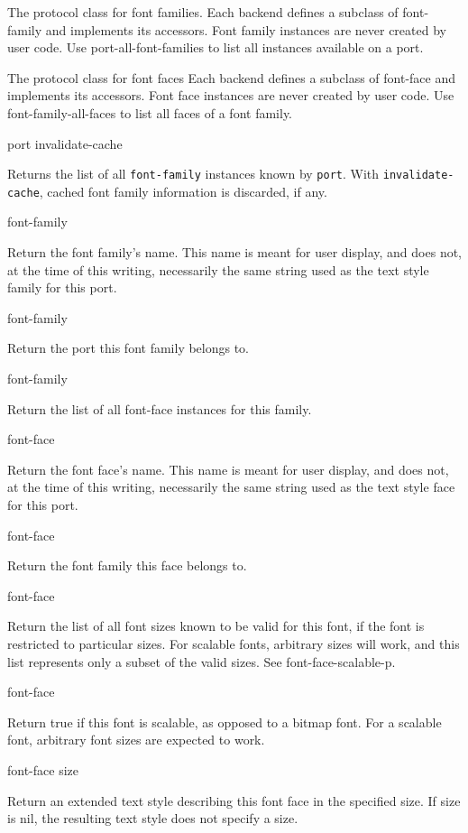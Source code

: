 
The protocol class for font families.  Each backend defines a subclass
of font-family and implements its accessors.  Font family instances
are never created by user code.  Use port-all-font-families to list
all instances available on a port.


The protocol class for font faces Each backend defines a subclass of
font-face and implements its accessors.  Font face instances are never
created by user code.  Use font-family-all-faces to list all faces of
a font family.

 {port \key invalidate-cache \allow}

Returns the list of all \texttt{font-family} instances known by
\texttt{port}.  With \texttt{invalidate-cache}, cached font family
information is discarded, if any.

 {font-family}

Return the font family's name.  This name is meant for user display,
and does not, at the time of this writing, necessarily the same string
used as the text style family for this port.

 {font-family}

Return the port this font family belongs to.

 {font-family}

Return the list of all font-face instances for this family.

 {font-face}

Return the font face's name.  This name is meant for user display, and
does not, at the time of this writing, necessarily the same string
used as the text style face for this port.

 {font-face}

Return the font family this face belongs to.

 {font-face}

Return the list of all font sizes known to be valid for this font, if
the font is restricted to particular sizes.  For scalable fonts,
arbitrary sizes will work, and this list represents only a subset of
the valid sizes.  See font-face-scalable-p.

 {font-face}

Return true if this font is scalable, as opposed to a bitmap font.
For a scalable font, arbitrary font sizes are expected to work.

 {font-face \optional size}

Return an extended text style describing this font face in the specified
size.  If size is nil, the resulting text style does not specify a size.
